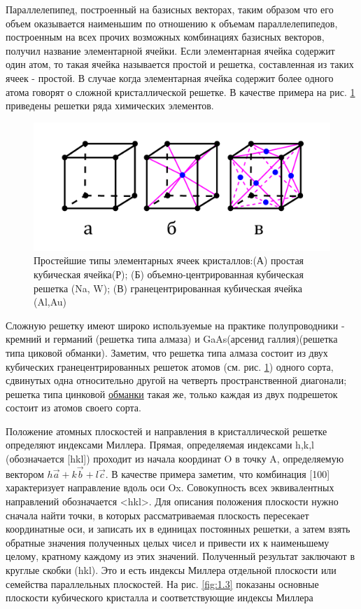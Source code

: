 	Параллелепипед, построенный на базисных векторах, таким образом что его объем оказывается наименьшим по отношению к
	объемам параллелепипедов, построенным на всех прочих возможных комбинациях базисных векторов, получил название
	элементарной ячейки. Если элементарная ячейка содержит один атом, то такая ячейка называется простой и решетка,
	составленная из таких ячеек - простой. В случае когда элементарная ячейка содержит более одного атома говорят о сложной
	кристаллической решетке. В качестве примера на рис. \ref{fig:1.2} приведены решетки ряда химических элементов.
	
	\begin{figure}[h!]
		\centering
		\includegraphics[width = .8\linewidth]{img/12}
		\caption{Простейшие типы элементарных ячеек кристаллов:(А) простая кубическая ячейка(Р); (Б) объемно-центрированная кубическая решетка (Na, W); (В) гранецентрированная кубическая ячейка (Al,Au)}
		\label{fig:1.2}
	\end{figure}
	
	Сложную решетку имеют широко используемые на практике полупроводники - кремний и германий (решетка типа алмаза) и
	GaAs(арсенид галлия)(решетка типа циковой обманки). Заметим, что решетка типа алмаза состоит из двух кубических
	гранецентрированных решеток атомов (см. рис. \ref{fig:1.2}) одного сорта, сдвинутых одна относительно другой на четверть
	пространственной диагонали; решетка типа цинковой
	\href{https://ru.wikipedia.org/wiki/%D0%9E%D0%B1%D0%BC%D0%B0%D0%BD%D0%BA%D0%B8}{обманки} такая же, только каждая из двух
		подрешеток состоит из атомов своего сорта.
		
		Положение атомных плоскостей и направления в кристаллической решетке определяют индексами Миллера. Прямая, определяемая
		индексами h,k,l (обозначается [hkl]) проходит из начала координат O в точку A, определяемую вектором $h \vec{a} + k
		\vec{b} + l \vec{c}$. В качестве примера заметим, что комбинация [100] характеризует направление вдоль оси Ox.
		Совокупность всех эквивалентных направлений обозначается <hkl>. Для описания положения плоскости нужно сначала найти точки, в которых рассматриваемая
		плоскость пересекает координатные оси, и записать их в единицах постоянных решетки, а затем взять обратные значения
		полученных целых чисел и привести их к наименьшему целому, кратному каждому из этих значений. Полученный результат
		заключают в круглые скобки (hkl). Это и есть индексы Миллера отдельной плоскости или семейства параллельных плоскостей.
		На рис. \ref{fig:1.3} показаны основные плоскости кубического кристалла и соответствующие индексы Миллера
		
